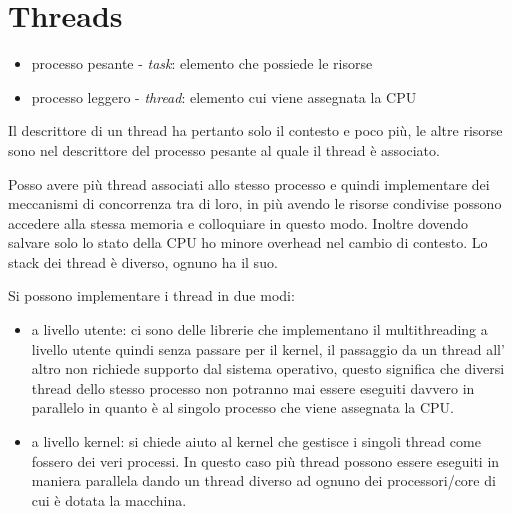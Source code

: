 \section{Threads}
\begin{itemize}
    \item processo pesante - \emph{task}: elemento che possiede le risorse
    \item processo leggero - \emph{thread}: elemento cui viene assegnata la CPU
\end{itemize}
Il descrittore di un thread ha pertanto solo il contesto e poco più, le altre risorse sono nel descrittore del processo pesante al quale il thread è associato.

Posso avere più thread associati allo stesso processo e quindi implementare dei meccanismi di concorrenza tra di loro, in più avendo le risorse condivise possono accedere alla stessa memoria e colloquiare in questo modo.
Inoltre dovendo salvare solo lo stato della CPU ho minore overhead nel cambio di contesto.
Lo stack dei thread è diverso, ognuno ha il suo.

Si possono implementare i thread in due modi:
\begin{itemize}
    \item a livello utente: ci sono delle librerie che implementano il multithreading a livello utente quindi senza passare per il kernel, il passaggio da un thread all' altro non richiede supporto dal sistema operativo, questo significa che diversi thread dello stesso processo non potranno mai essere eseguiti davvero in parallelo in quanto è al singolo processo che viene assegnata la CPU.
    
    \item a livello kernel: si chiede aiuto al kernel che gestisce i singoli thread come fossero dei veri processi.
    In questo caso più thread possono essere eseguiti in maniera parallela dando un thread diverso ad ognuno dei processori/core di cui è dotata la macchina.
\end{itemize}

